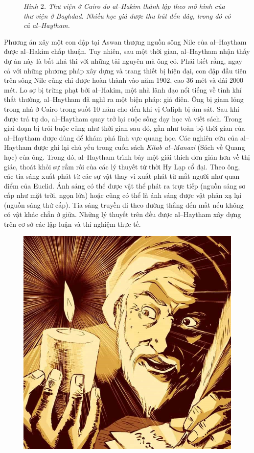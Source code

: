 \begin{multicols}{2}
\begin{figure}[H]
		\caption{\small\textit{\color{lichsutoanhoc}Hình $2$. Thư viện ở Cairo do al--Hakim thành lập theo mô hình của thư viện ở Baghdad. Nhiều học giả được thu hút đến đây, trong đó có cả al--Haytham.}}
		\vspace*{-10pt}
	\end{figure}
	Phương án xây một con đập tại Aswan thượng nguồn sông Nile của al--Haytham được al--Hakim chấp thuận. Tuy nhiên, sau một thời gian, al--Haytham nhận thấy dự án này là bất khả thi với những tài nguyên mà ông có. Phải biết rằng, ngay cả với những phương pháp xây dựng và trang thiết bị hiện đại, con đập đầu tiên trên sông Nile cũng chỉ được hoàn thành vào năm $1902$, cao $36$ mét và dài $2000$ mét. Lo sợ bị trừng phạt bởi al--Hakim, một nhà lãnh đạo nổi tiếng về tính khí thất thường, al--Haytham đã nghĩ ra một biện pháp: giả điên. Ông bị giam lỏng trong nhà ở Cairo trong suốt 10 năm cho đến khi vị Caliph bị ám sát. Sau khi được trả tự do, al--Haytham quay trở lại cuộc sống dạy học và viết sách. Trong giai đoạn bị trói buộc cũng như thời gian sau đó, gần như toàn bộ thời gian của al--Haytham được dùng để khám phá lĩnh vực quang học.
	\vskip 0.1cm
	Các nghiên cứu của al--Haytham được ghi lại chủ yếu trong cuốn sách \textit{Kitab al--Manazi} (Sách về Quang học) của ông. Trong đó, al--Haytham trình bày một giải thích đơn giản hơn về thị giác, thoát khỏi sự rắm rối của các lý thuyết từ thời Hy Lạp cổ đại. Theo ông, các tia sáng xuất phát từ các sự vật thay vì xuất phát từ mắt người như quan điểm của Euclid. Ánh sáng có thể được vật thể phát ra trực tiếp (nguồn sáng sơ cấp như mặt trời, ngọn lửa) hoặc cũng có thể là ánh sáng được vật phản xạ lại (nguồn sáng thứ cấp). Tia sáng truyền đi theo đường thẳng đến mắt nếu không có vật khác chắn ở giữa. Những lý thuyết trên đều được al--Haytham xây dựng trên cơ sở các lập luận và thí nghiệm thực tế. 
	\begin{figure}[H]
		\vspace*{-5pt}
		\centering
		\captionsetup{labelformat= empty, justification=centering}
		\includegraphics[width= 0.75\linewidth]{4}

\end{figure}
\end{multicols}

